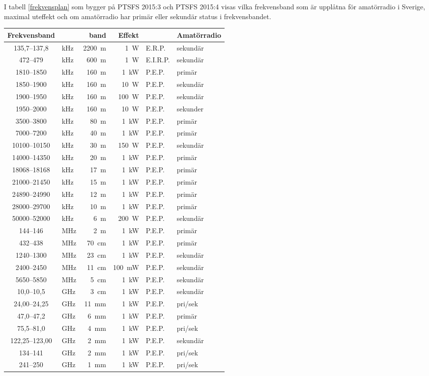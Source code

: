 I tabell \ref{frekvensplan} som bygger på PTSFS 2015:3 och PTSFS 2015:4 visas
vilka frekvensband som är upplåtna för amatörradio i Sverige, maximal uteffekt
och om amatörradio har primär eller sekundär status i frekvensbandet.

\begin{table*}[ht] 
\begin{tabular}{clr|rl|l} 
Frekvensband &  & band & Effekt & & Amatörradio\\ \hline 
135,7--137,8 & kHz & 2200~m & 1~W & E.R.P. & sekundär\\ 
472--479 & kHz & 600~m & 1~W & E.I.R.P. & sekundär\\ 
1810--1850 & kHz & 160~m & 1~kW & P.E.P. & primär\\ 
1850--1900 & kHz & 160~m & 10~W & P.E.P. & sekundär\\ 
1900--1950 & kHz & 160~m & 100~W & P.E.P. & sekundär\\ 
1950--2000 & kHz & 160~m & 10~W & P.E.P. & sekunder\\ 
3500--3800 & kHz & 80~m  & 1~kW & P.E.P. & primär\\ 
7000--7200 & kHz & 40~m  & 1~kW & P.E.P. & primär\\ 
10100--10150 & kHz & 30~m & 150~W & P.E.P. & sekundär\\ 
14000--14350 & kHz & 20~m & 1~kW & P.E.P. & primär\\ 
18068--18168 & kHz & 17~m & 1~kW & P.E.P. & primär\\ 
21000--21450 & kHz & 15~m & 1~kW & P.E.P. & primär\\ 
24890--24990 & kHz & 12~m & 1~kW & P.E.P. & primär\\ 
28000--29700 & kHz & 10~m & 1~kW & P.E.P. & primär\\ 
50000--52000 & kHz & 6~m & 200~W & P.E.P. & sekundär\\ \hline 
144--146 & MHz & 2~m & 1~kW & P.E.P. & primär\\ 
432--438 & MHz & 70~cm & 1~kW & P.E.P. & primär\\ 
1240--1300 & MHz & 23~cm & 1~kW & P.E.P. & sekundär\\ 
2400--2450 & MHz & 11~cm & 100~mW & P.E.P. & sekundär\\ 
5650--5850 & MHz & 5~cm & 1~kW & P.E.P. & sekundär\\ 
10,0--10,5 & GHz & 3~cm & 1~kW & P.E.P. & sekundär\\ 
24,00--24,25 & GHz & 11~mm & 1~kW & P.E.P. & pri/sek\\ 
47,0--47,2 & GHz & 6~mm & 1~kW & P.E.P. & primär\\ 
75,5--81,0 & GHz & 4~mm & 1~kW & P.E.P. & pri/sek\\ 
122,25--123,00 & GHz & 2~mm & 1~kW & P.E.P. & sekundär\\ 
134--141 & GHz & 2~mm & 1~kW & P.E.P. & pri/sek\\ 
241--250 & GHz & 1~mm & 1~kW & P.E.P. & pri/sek\\ 
\end{tabular} 
\caption{Frekvensband för amatörradio i Sverige} 
\label{frekvensplan} 
\end{table*} 
